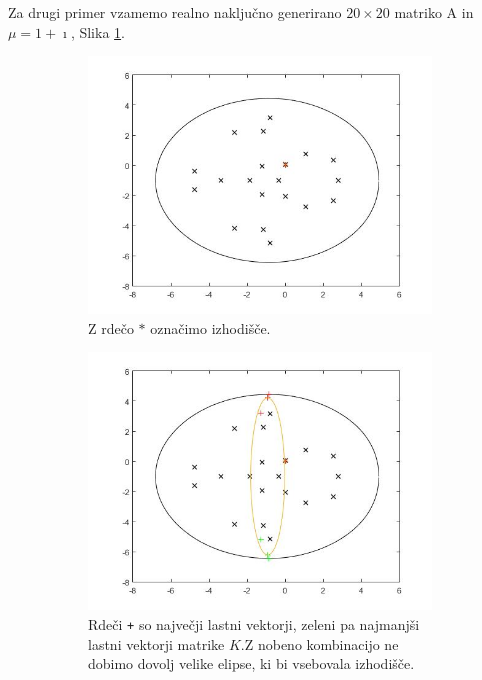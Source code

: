 \documentclass[12pt,a4paper]{amsart}
\theoremstyle{definition}
\theoremstyle{plain}
\begin{document}
Za drugi primer vzamemo realno naključno generirano $20\times 20$ matriko A in $\mu = 1 + \imath$, Slika \ref{fig:p41}.
\begin{figure}[H]
\begin{subfigure}[t]{0.5\textwidth}
\includegraphics[width=0.9\linewidth]{RC2.jpg}
\caption{Z rdečo $\ast$ označimo izhodišče.}
\label{fig:p41}
\end{subfigure}%
\hfill
\begin{subfigure}[t]{0.5\textwidth}
\includegraphics[width=0.9\linewidth]{RC2e1.jpg}
\caption{Rdeči \verb~+~ so največji lastni vektorji, zeleni pa najmanjši lastni vektorji matrike $K$.\footnotemark Z nobeno kombinacijo ne dobimo dovolj velike elipse, ki bi vsebovala izhodišče.}
\label{fig:p42}
\end{subfigure}
\hfill
\begin{subfigure}[t]{0.5\textwidth}

\end{subfigure}
\end{figure}
\end{document}
